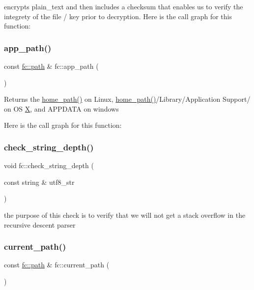 encrypts plain\+\_\+text and then includes a checksum that enables us to verify the integrety of the file / key prior to decryption. Here is the call graph for this function\+:
\mbox{\label{namespacefc_a3e2cb20721f4d3404ec07ff31694153e}} 
\subsubsection{\texorpdfstring{app\+\_\+path()}{app\_path()}}
{\footnotesize\ttfamily const \mbox{\hyperlink{classfc_1_1path}{fc\+::path}} \& fc\+::app\+\_\+path (\begin{DoxyParamCaption}{ }\end{DoxyParamCaption})}

\begin{DoxyReturn}{Returns}
the \mbox{\hyperlink{namespacefc_a638386a755d79377ef4c5c779c731e43}{home\+\_\+path()}} on Linux, \mbox{\hyperlink{namespacefc_a638386a755d79377ef4c5c779c731e43}{home\+\_\+path()}}/\+Library/\+Application Support/ on OS \mbox{\hyperlink{class_x}{X}}, and A\+P\+P\+D\+A\+TA on windows 
\end{DoxyReturn}
Here is the call graph for this function\+:
\mbox{\label{namespacefc_a7c4e6142a78452fe481b4c963117f513}} 
\subsubsection{\texorpdfstring{check\+\_\+string\+\_\+depth()}{check\_string\_depth()}}
{\footnotesize\ttfamily void fc\+::check\+\_\+string\+\_\+depth (\begin{DoxyParamCaption}\item[{const string \&}]{utf8\+\_\+str }\end{DoxyParamCaption})}

the purpose of this check is to verify that we will not get a stack overflow in the recursive descent parser \mbox{\label{namespacefc_a6e83f7c8488e348511224442f4591d33}} 
\subsubsection{\texorpdfstring{current\+\_\+path()}{current\_path()}}
{\footnotesize\ttfamily const \mbox{\hyperlink{classfc_1_1path}{fc\+::path}} \& fc\+::current\+\_\+path (\begin{DoxyParamCaption}{ }\end{DoxyParamCaption})}

